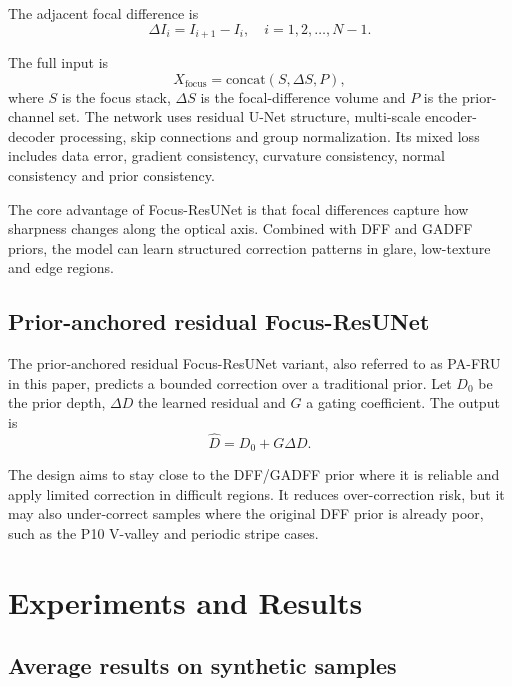 \documentclass[11pt,a4paper]{article}
\begin{document}
The adjacent focal difference is
\begin{equation}
\Delta I_i = I_{i+1}-I_i,\quad i=1,2,\ldots,N-1.
\end{equation}

The full input is
\begin{equation}
X_{\mathrm{focus}}=\mathrm{concat}(S,\Delta S,P),
\end{equation}
where \(S\) is the focus stack, \(\Delta S\) is the focal-difference volume and \(P\) is the prior-channel set. The network uses residual U-Net structure, multi-scale encoder-decoder processing, skip connections and group normalization. Its mixed loss includes data error, gradient consistency, curvature consistency, normal consistency and prior consistency.

The core advantage of Focus-ResUNet is that focal differences capture how sharpness changes along the optical axis. Combined with DFF and GADFF priors, the model can learn structured correction patterns in glare, low-texture and edge regions.

\subsection{Prior-anchored residual Focus-ResUNet}

The prior-anchored residual Focus-ResUNet variant, also referred to as PA-FRU in this paper, predicts a bounded correction over a traditional prior. Let \(D_0\) be the prior depth, \(\Delta D\) the learned residual and \(G\) a gating coefficient. The output is
\begin{equation}
\hat{D}=D_0+G\Delta D.
\end{equation}

The design aims to stay close to the DFF/GADFF prior where it is reliable and apply limited correction in difficult regions. It reduces over-correction risk, but it may also under-correct samples where the original DFF prior is already poor, such as the P10 V-valley and periodic stripe cases.

\section{Experiments and Results}

\subsection{Average results on synthetic samples}
\end{document}
